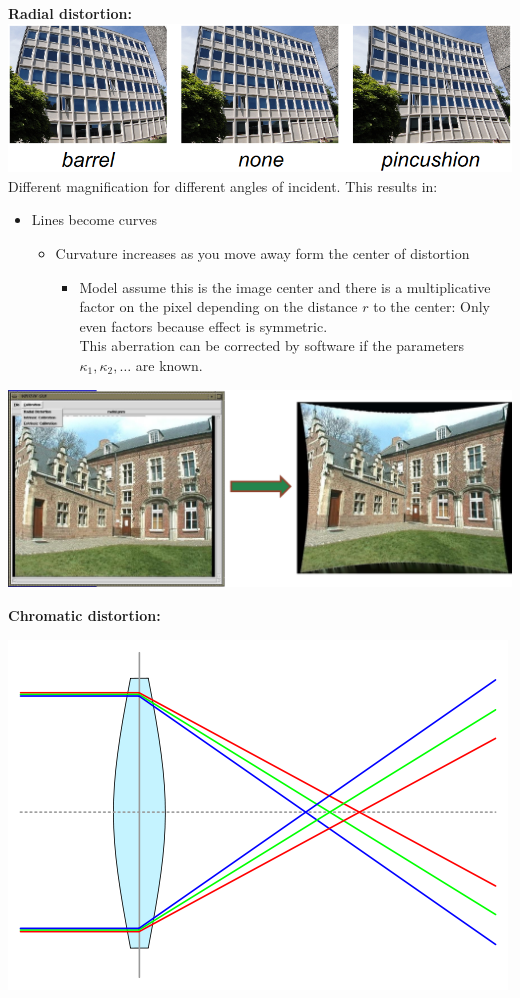 \documentclass[a4paper, fontsize=8pt, landscape, DIV=1]{scrartcl}
\begin{document}
\begin{multicols*}{4}
		\textbf{Radial distortion:}\\
		\includegraphics[width=\columnwidth]{images//ImageAcq/radial_dist.png}\\
		Different magnification for different angles of incident. This results in: 
		\begin{itemize}
			\item Lines become curves
				\begin{itemize}[label={$\rightarrow$}]
					\item Curvature increases as you move away form the center of distortion
						\begin{itemize}[label={$\rightarrow$}]
							\item Model assume this is the image center and there is a multiplicative factor on the pixel depending on the distance $r$ to the center:
							\vspace{-0.4cm}
							Only even factors because effect is symmetric.\\
							This aberration can be corrected by software if the parameters $\kappa_1, \kappa_2, \dots$ are known.
						\end{itemize} 
				\end{itemize}
		\end{itemize}
		\includegraphics[width=\columnwidth]{images/ImageAcq/radial_dist_2.png}\\
		\par 
		\textbf{Chromatic distortion:}
		\begin{center}
			\includegraphics[width=0.7\columnwidth]{images//ImageAcq/chromatic_aberration.png}\\

\end{center}
\end{multicols*}
\end{document}
